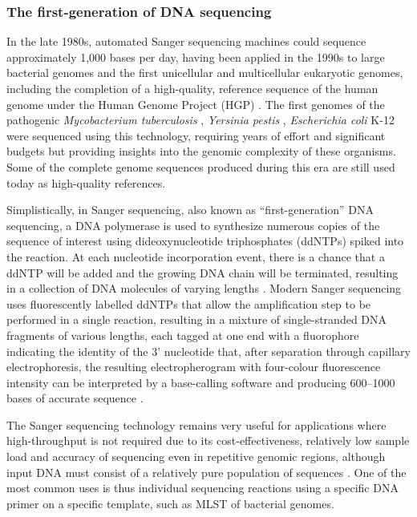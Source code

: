 \subsubsection{The first-generation of DNA sequencing} \label{ssec:1st_gen_seq}

In the late 1980s, automated Sanger sequencing machines could sequence approximately 1,000 bases per day, having been applied in the 1990s to large bacterial genomes and the first unicellular and multicellular eukaryotic genomes, including the completion of a high-quality, reference sequence of the human genome under the Human Genome Project (HGP) \citep{koch_sequencing_2021, collins_human_1995}. 
The first genomes of the pathogenic \textit{Mycobacterium tuberculosis} \citep{cole_deciphering_1998}, \textit{Yersinia pestis} \citep{parkhill_genome_2001}, \textit{Escherichia coli} K-12 \citep{blattner_complete_1997} were sequenced using this technology, requiring years of effort and significant budgets but providing insights into the genomic complexity of these organisms. 
Some of the complete genome sequences produced during this era are still used today as high-quality references. 

Simplistically, in Sanger sequencing, also known as “first-generation” DNA sequencing, a DNA polymerase is used to synthesize numerous copies of the sequence of interest using dideoxynucleotide triphosphates (ddNTPs) spiked into the reaction. 
At each nucleotide incorporation event, there is a chance that a ddNTP will be added and the growing DNA chain will be terminated, resulting in a collection of DNA molecules of varying lengths \citep{sanger_dna_1977, hagemann_overview_2015}. 
Modern Sanger sequencing uses fluorescently labelled ddNTPs that allow the amplification step to be performed in a single reaction, resulting in a mixture of single-stranded DNA fragments of various lengths, each tagged at one end with a fluorophore indicating the identity of the 3' nucleotide that, after separation through capillary electrophoresis, the resulting electropherogram with four-colour fluorescence intensity can be interpreted by a base-calling software and producing 600–1000 bases of accurate sequence \citep{hagemann_overview_2015}. 

The Sanger sequencing technology remains very useful for applications where high-throughput is not required due to its cost-effectiveness, relatively low sample load and accuracy of sequencing even in repetitive genomic regions, although input DNA must consist of a relatively pure population of sequences \citep{slatko_overview_2018}. 
One of the most common uses is thus individual sequencing reactions using a specific DNA primer on a specific template, such as MLST of bacterial genomes. 

